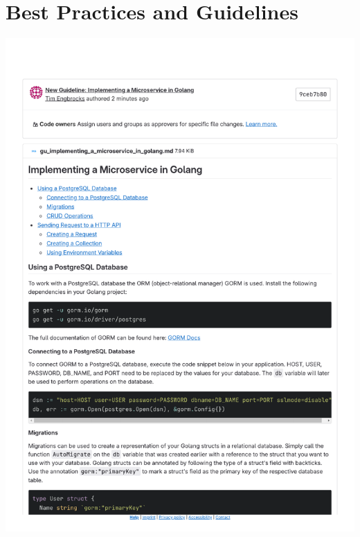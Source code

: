 \section{Best Practices and Guidelines}

\includegraphics[height=\textheight]{pdfs/ume_gu_implementing_a_microservice_in_golang.pdf}



%
%
\makeatletter
\renewenvironment{thebibliography}[1]
     {\section{\bibname}
      \list{\@biblabel{\@arabic\c@enumiv}}
           {\settowidth\labelwidth{\@biblabel{#1}}
            \leftmargin\labelwidth
            \advance\leftmargin\labelsep
            \@openbib@code
            \usecounter{enumiv}%
            \let\p@enumiv\@empty
            \renewcommand\theenumiv{\@arabic\c@enumiv}}
      \sloppy
      \clubpenalty4000
      \@clubpenalty \clubpenalty
      \widowpenalty4000
      \sfcode`\.\@m}
     {\def\@noitemerr
       {\@latex@warning{Empty `thebibliography' environment}}%
      \endlist}
\makeatother



